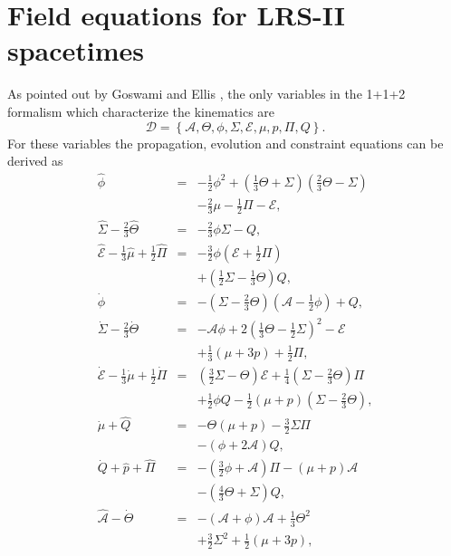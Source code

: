 \documentclass[abstract=on,notitlepage,superscriptaddress,nofootinbib,aps,showpacs,twocolumn,prd]{revtex4}
\newcommand{\0}{^{(0)}}
\newcommand{\1}{^{(1)}}
\newcommand{\2}{^{(2)}}
\newcommand{\3}{{}^{(3)}}
\begin{document}

\section{Field equations for LRS-II spacetimes}

As pointed out by Goswami and Ellis \cite{birkhoff}, the only variables in the 1+1+2 formalism which characterize the kinematics are  
\begin{equation} \label{setD}
\mathcal{D} = \left\{\mathcal{A},\Theta,\phi,\Sigma,\mathcal{E},\mu,p,\Pi,Q\right\}.
\end{equation}
For these variables the propagation, evolution and constraint equations can be derived as
\begin{eqnarray}
\label{LRSstart}
	\hat{\phi} &=& -\frac{1}{2}\phi^2+\left(\frac{1}{3}\Theta+\Sigma\right)\left(\frac{2}{3}\Theta - \Sigma\right) \nonumber\\
	& & -\frac{2}{3}\mu-\frac{1}{2}\Pi-\mathcal{E},\label{A}\\	
	\hat{\Sigma}-\frac{2}{3}\hat{\Theta} &=&-\frac{2}{3}\phi\Sigma-Q,\label{B}\\	
	\hat{\mathcal{E}}-\frac{1}{3}\hat{\mu}+\frac{1}{2}\hat{\Pi} &=&-\frac{3}{2}\phi\left(\mathcal{E} +\frac{1}{2}\Pi\right) 
	\nonumber\\ && +\left(\frac{1}{2}\Sigma-\frac{1}{3}\Theta\right)Q,\label{C}\\	
	\dot{\phi}&=&-\left(\Sigma-\frac{2}{3}\Theta\right)\left(\mathcal{A}-\frac{1}{2}\phi\right)+Q,\label{D}\\	
	\dot{\Sigma}-\frac{2}{3}\dot{\Theta}&=&-\mathcal{A}\phi+2\left(\frac{1}{3}\Theta-\frac{1}{2}\Sigma\right)^2 -\mathcal{E}
	\nonumber\\ & & +\frac{1}{3}(\mu+3p)+\frac{1}{2}\Pi,\label{E} \\	
	\dot{\mathcal{E}}-\frac{1}{3}\dot{\mu}+\frac{1}{2}\dot{\Pi}&=&\left(\frac{3}{2}\Sigma-\Theta\right)\mathcal{E}+\frac{1}{4}\left(\Sigma-\frac{2}{3}\Theta\right)\Pi
	\nonumber\\ && +\frac{1}{2}\phi Q-\frac{1}{2}(\mu+p)\left(\Sigma-\frac{2}{3}\Theta\right),\label{F}\\	
	\dot{\mu}+\hat{Q}&=& -\Theta(\mu+p) -\frac{3}{2}\Sigma\Pi \nonumber\\
	 && -(\phi+2\mathcal{A})Q,\label{G}\\	
	\dot{Q}+\hat{p}+\hat{\Pi}&=&-\left(\frac{3}{2}\phi+\mathcal{A}\right)\Pi -(\mu+p)\mathcal{A} \nonumber\\
	&& -\left(\frac{4}{3}\Theta+\Sigma\right)Q,\label{H}\\	
	\label{LRSend}
	\hat{\mathcal{A}}-\dot{\Theta}&=&-(\mathcal{A}+\phi)\mathcal{A}+\frac{1}{3}\Theta^2 \nonumber\\
	& &+\frac{3}{2}\Sigma^2+\frac{1}{2}\left(\mu+3p\right)\label{I},
\end{eqnarray}
\end{document}
